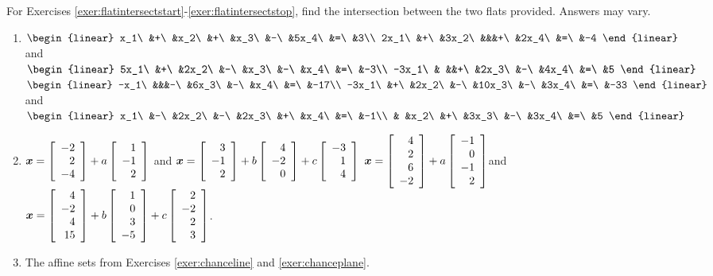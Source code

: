 \noindent For Exercises \ref{exer:flatintersectstart}-\ref{exer:flatintersectstop}, find the intersection between the two flats provided. Answers may vary.
\begin{enumerate}[!HW!]
\item\label{exer:flatintersectstart} $\begin{linear} %
x_1\ &+\ &x_2\ &+\ &x_3\ &-\ &5x_4\ &=\ &3\\
2x_1\ &+\ &3x_2\ &&&+\ &2x_4\ &=\ &-4
\end{linear}$\quad and\quad $\begin{linear}
5x_1\ &+\ &2x_2\ &-\ &x_3\ &-\ &x_4\ &=\ &-3\\
-3x_1\ & &&+\ &2x_3\ &-\ &4x_4\ &=\ &5
\end{linear}$ 
\itemspade $\begin{linear}
-x_1\ &&&-\ &6x_3\ &-\ &x_4\ &=\ &-17\\
-3x_1\ &+\ &2x_2\ &-\ &10x_3\ &-\ &3x_4\ &=\ &-33
\end{linear}$\quad and\quad $\begin{linear}
x_1\ &-\ &2x_2\ &-\ &2x_3\ &+\ &x_4\ &=\ &-1\\
& &x_2\ &+\ &3x_3\ &-\ &3x_4\ &=\ &5
\end{linear}$ 
\item $\boldsymbol x = \left[\begin{array}{r} -2\\2\\-4 \end{array}\right]+a\left[\begin{array}{r} 1\\-1\\2 \end{array}\right]$ and $\boldsymbol x=\left[\begin{array}{r} 3\\-1\\2 \end{array}\right]+b\left[\begin{array}{r} 4\\-2\\0 \end{array}\right]+c\left[\begin{array}{r} -3\\1\\4 \end{array}\right]$ %
\itemspade $\boldsymbol x = \left[\begin{array}{r} 4\\2\\6\\-2 \end{array}\right] + a\left[\begin{array}{r} -1\\0\\-1\\2 \end{array}\right]$\quad and \quad $\boldsymbol x  = \left[\begin{array}{r} 4\\-2\\4\\15 \end{array}\right] + b\left[\begin{array}{r} 1\\0\\3\\-5 \end{array}\right] + c\left[\begin{array}{r} 2\\-2\\2\\3 \end{array}\right]$.
\item\label{exer:flatintersectstop} The affine sets from Exercises \ref{exer:chanceline} and \ref{exer:chanceplane}. %
\end{enumerate}

